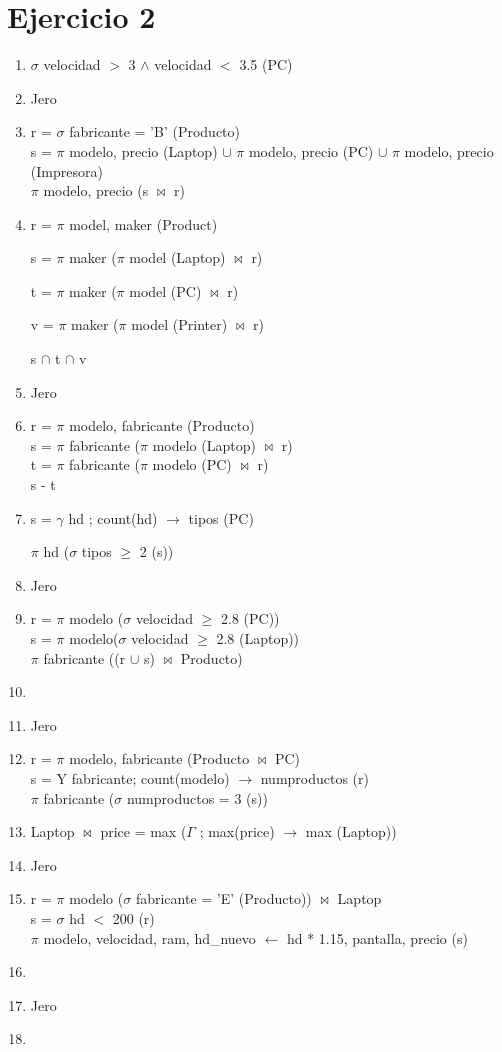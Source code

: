 \documentclass[a4paper, 12pt]{report}
\begin{document}
\section*{Ejercicio 2}{
\begin{enumerate}[label=\alph*)]
\item{$\sigma$ velocidad $>$ 3 $\wedge$  velocidad  $< $ 3.5 (PC)}
\item{Jero}
\item{r = $\sigma$ fabricante = 'B' (Producto)\\
	s = $\pi$ modelo, precio (Laptop) $\cup$ $\pi$ modelo, precio (PC)
	$\cup$ $\pi$ modelo, precio (Impresora) \\
	$\pi$ modelo, precio (s $\Join$ r)}
\item{r = $\pi$ model, maker (Product)

s = $\pi$ maker ($\pi$ model (Laptop) $\Join$ r)	

t = $\pi$ maker ($\pi$ model (PC) $\Join$ r)

v = $\pi$ maker ($\pi$ model (Printer) $\Join$ r)

s $\cap$ t $\cap$ v}
\item{Jero}
\item{r = $\pi$ modelo, fabricante (Producto)\\
	s = $\pi$ fabricante ($\pi$ modelo (Laptop) $\Join$ r)\\
	t = $\pi$ fabricante ($\pi$ modelo (PC) $\Join$ r)\\
	s - t\\}
\item{s = $\gamma$ hd ; count(hd) $\rightarrow$ tipos (PC)

$\pi$ hd ($\sigma$ tipos $\geq$ 2 (s))}
\item{Jero}
\item{r = $\pi$ modelo ($\sigma$ velocidad $\geq$ 2.8 (PC))\\
s = $\pi$ modelo($\sigma$ velocidad $\geq$ 2.8 (Laptop))\\
$\pi$ fabricante ((r $\cup$ s) $\Join$ Producto)\\
}
\item{}
\item{Jero}
\item{r = $\pi$ modelo, fabricante (Producto $\Join$ PC)\\
s = Y fabricante; count(modelo) $\rightarrow$ numproductos (r)\\
$\pi$ fabricante ($\sigma$ numproductos = 3 (s))}
\item{Laptop $\Join$ price = max ($\Gamma$ ; max(price) $\rightarrow$ max (Laptop))}
\item{Jero}
\item{r = $\pi$ modelo ($\sigma$ fabricante = 'E' (Producto)) $\Join$ Laptop\\
s = $\sigma$ hd $<$ 200 (r)\\
$\pi$ modelo, velocidad, ram, hd\_nuevo $\leftarrow$ hd * 1.15, pantalla, precio (s)\\
}
\item{}
\item{Jero}
\item{}
\end{enumerate}
}
\end{document}
